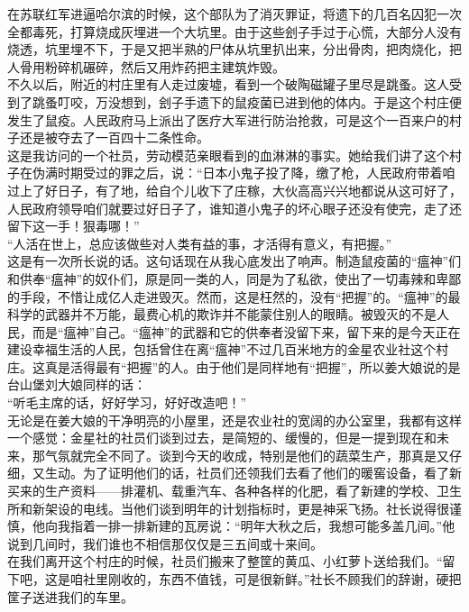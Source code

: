 在苏联红军进逼哈尔滨的时候，这个部队为了消灭罪证，将遗下的几百名囚犯一次全都毒死，打算烧成灰埋进一个大坑里。由于这些刽子手过于心慌，大部分人没有烧透，坑里埋不下，于是又把半熟的尸体从坑里扒出来，分出骨肉，把肉烧化，把人骨用粉碎机碾碎，然后又用炸药把主建筑炸毁。\\

不久以后，附近的村庄里有人走过废墟，看到一个破陶磁罐子里尽是跳蚤。这人受到了跳蚤叮咬，万没想到，刽子手遗下的鼠疫菌已进到他的体内。于是这个村庄便发生了鼠疫。人民政府马上派出了医疗大军进行防治抢救，可是这个一百来户的村子还是被夺去了一百四十二条性命。\\

这是我访问的一个社员，劳动模范亲眼看到的血淋淋的事实。她给我们讲了这个村子在伪满时期受过的罪之后，说：“日本小鬼子投了降，缴了枪，人民政府带着咱过上了好日子，有了地，给自个儿收下了庄稼，大伙高高兴兴地都说从这可好了，人民政府领导咱们就要过好日子了，谁知道小鬼子的坏心眼子还没有使完，走了还留下这一手！狠毒哪！”\\

“人活在世上，总应该做些对人类有益的事，才活得有意义，有把握。”\\

这是有一次所长说的话。这句话现在从我心底发出了响声。制造鼠疫菌的“瘟神”们和供奉“瘟神”的奴仆们，原是同一类的人，同是为了私欲，使出了一切毒辣和卑鄙的手段，不惜让成亿人走进毁灭。然而，这是枉然的，没有“把握”的。“瘟神”的最科学的武器并不万能，最费心机的欺诈并不能蒙住别人的眼睛。被毁灭的不是人民，而是“瘟神”自己。“瘟神”的武器和它的供奉者没留下来，留下来的是今天正在建设幸福生活的人民，包括曾住在离“瘟神”不过几百米地方的金星农业社这个村庄。这真是活得最有“把握”的人。由于他们是同样地有“把握”，所以姜大娘说的是台山堡刘大娘同样的话：\\

“听毛主席的话，好好学习，好好改造吧！”\\

无论是在姜大娘的干净明亮的小屋里，还是农业社的宽阔的办公室里，我都有这样一个感觉：金星社的社员们谈到过去，是简短的、缓慢的，但是一提到现在和未来，那气氛就完全不同了。谈到今天的收成，特别是他们的蔬菜生产，那真是又仔细，又生动。为了证明他们的话，社员们还领我们去看了他们的暖窖设备，看了新买来的生产资料——排灌机、载重汽车、各种各样的化肥，看了新建的学校、卫生所和新架设的电线。当他们谈到明年的计划指标时，更是神采飞扬。社长说得很谨慎，他向我指着一排一排新建的瓦房说：“明年大秋之后，我想可能多盖几间。”他说到几间时，我们谁也不相信那仅仅是三五间或十来间。\\

在我们离开这个村庄的时候，社员们搬来了整筐的黄瓜、小红萝卜送给我们。“留下吧，这是咱社里刚收的，东西不值钱，可是很新鲜。”社长不顾我们的辞谢，硬把筐子送进我们的车里。\\

